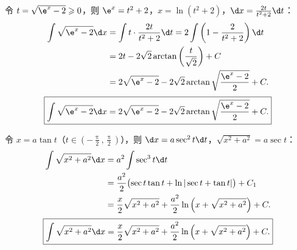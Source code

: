 \begin{solution}

    令 $t = \sqrt{\e^x - 2} \geqslant 0$，则 $\e^x = t^2 + 2$，$x = \ln(t^2 + 2)$，$\d x = \frac{2t}{t^2 + 2}\d t$：
    \begin{equation}
        \begin{aligned}
            \int \sqrt{\e^x - 2} \d x & = \int t \cdot \frac{2t}{t^2 + 2} \d t = 2\int \left( 1 - \frac{2}{t^2 + 2} \right) \d t \\
                                      & = 2t - 2\sqrt{2}\arctan\left( \frac{t}{\sqrt{2}} \right) + C                             \\
                                      & = 2\sqrt{\e^x - 2} - 2\sqrt{2}\arctan\sqrt{\frac{\e^x - 2}{2}} + C.
        \end{aligned}
    \end{equation}
    \begin{equation}
        \boxed{\int \sqrt{\e^x - 2} \d x = 2\sqrt{\e^x - 2} - 2\sqrt{2}\arctan\sqrt{\frac{\e^x - 2}{2}} + C.}
    \end{equation}


    令 $x = a\tan t$（$t \in \left(-\frac{\uppi}{2}, \frac{\uppi}{2}\right)$），则 $\d x = a\sec^2 t \d t$，$\sqrt{x^2 + a^2} = a\sec t$：
    \begin{equation}
        \begin{aligned}
            \int \sqrt{x^2 + a^2} \d x & = a^2 \int \sec^3 t \d t                                                                 \\
                                       & = \frac{a^2}{2}\bigl( \sec t \tan t + \ln|\sec t + \tan t| \bigr) + C_1                  \\
                                       & = \frac{x}{2}\sqrt{x^2 + a^2} + \frac{a^2}{2}\ln\left( x + \sqrt{x^2 + a^2} \right) + C.
        \end{aligned}
    \end{equation}
    \begin{equation}
        \boxed{\int \sqrt{x^2 + a^2} \d x = \frac{x}{2}\sqrt{x^2 + a^2} + \frac{a^2}{2}\ln\left( x + \sqrt{x^2 + a^2} \right) + C.}
    \end{equation}



\end{solution}
